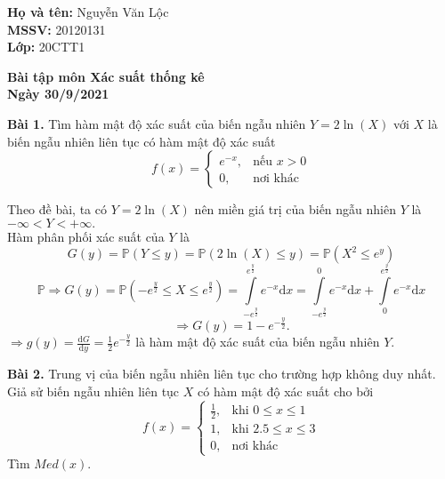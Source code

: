 \documentclass[12pt,a4paper]{article}
\author{Nguyễn Văn Lộc}
\begin{document}
\fancyhf{}
\lhead{}
\chead{}
\rhead{}
\cfoot{}
\rfoot{\thepage}
\lfoot{}
\pagestyle{fancy}
\renewcommand{\headrulewidth}{0pt}
\renewcommand{\footrulewidth}{0pt}
\begin{mybox}
\textbf{Họ và tên:} Nguyễn Văn Lộc\\
\textbf{MSSV:} 20120131\\
\textbf{Lớp:} 20CTT1
\end{mybox}
\begin{center}
\fontsize{16}{14}\selectfont
\textbf{Bài tập môn Xác suất thống kê}\\
\textbf{Ngày 30/9/2021}
\end{center}
\begin{mybox}
\textbf{Bài 1.} Tìm hàm mật độ xác suất của biến ngẫu nhiên $Y = 2 \ln \left( X \right)$ với $X$ là biến ngẫu nhiên liên tục có hàm mật độ xác suất 
$$
f \left( x \right) = 
\begin{cases}
e^{-x},&\text{nếu } x >0\\
0,&\text{nơi khác}
\end{cases}
$$
\end{mybox}
Theo đề bài, ta có $Y = 2 \ln \left( X \right)$ nên miền giá trị của biến ngẫu nhiên $Y$ là $- \infty < Y < + \infty.$\\
Hàm phân phối xác suất của $Y$ là 
$$G\left( y \right) = \mathbb{P} \left( {Y \leqslant y} \right) = \mathbb{P} \left( {2\ln \left( X \right) \leqslant y} \right) = \mathbb{P} \left( {{X^2} \leqslant {e^y}} \right)$$
$$ \mathbb{P} \Rightarrow G\left( y \right) = \mathbb{P} \left( { - {e^{\frac{y}{2}}} \leqslant X \leqslant {e^{\frac{y}{2}}}} \right) = \int\limits_{ - {e^{\frac{y}{2}}}}^{{e^{\frac{y}{2}}}} {{e^{ - x}}} \mathrm{d}x = \int\limits_{ - {e^{\frac{y}{2}}}}^0 {{e^{ - x}}} \mathrm{d}x + \int\limits_0^{{e^{\frac{y}{2}}}} {{e^{ - x}}} \mathrm{d}x$$
$$ \Rightarrow G\left( y \right) = 1 - {e^{ - \frac{y}{2}}}.$$
$ \Rightarrow g\left( y \right) = \frac{\mathrm{d}G}{\mathrm{d}y} = \frac{1}{2}{e^{ - \frac{y}{2}}}$ là hàm mật độ xác suất của biến ngẫu nhiên $Y.$
\begin{mybox}
\textbf{Bài 2.} Trung vị của biến ngẫu nhiên liên tục cho trường hợp không duy nhất. Giả sử biến ngẫu nhiên liên tục $X$ có hàm mật độ xác suất cho bởi
$$f \left( x \right) = 
\begin{cases}
\frac{1}{2},&\text{khi } 0 \leqslant x \leqslant 1\\
1,&\text{khi } 2.5 \leqslant x \leqslant 3 \\
0,&\text{nơi khác}
\end{cases}
$$
Tìm $Med \left( x \right).$
\end{mybox}
\end{document}
